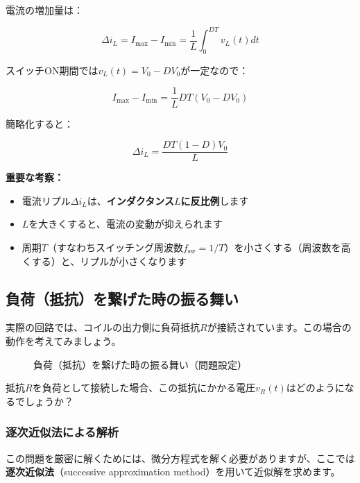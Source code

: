 電流の増加量は：

\begin{equation}
\Delta i_L = I_{\max} - I_{\min} = \frac{1}{L} \int_0^{DT} v_L(t)dt
\end{equation}

スイッチON期間では$v_L(t) = V_0 - DV_0$が一定なので：

\begin{equation}
I_{\max} - I_{\min} = \frac{1}{L} DT(V_0 - DV_0)
\end{equation}

簡略化すると：

\begin{equation}
\boxed{\Delta i_L = \frac{DT(1-D)V_0}{L}}
\end{equation}

\textbf{重要な考察：}

\begin{itemize}
\item 電流リプル$\Delta i_L$は、\textbf{インダクタンス$L$に反比例}します
\item $L$を大きくすると、電流の変動が抑えられます
\item 周期$T$（すなわちスイッチング周波数$f_{\text{sw}} = 1/T$）を小さくする（周波数を高くする）と、リプルが小さくなります
\end{itemize}

\subsection{負荷（抵抗）を繋げた時の振る舞い}

実際の回路では、コイルの出力側に負荷抵抗$R$が接続されています。この場合の動作を考えてみましょう。

\begin{figure}[H]
\centering
{}
\caption{負荷（抵抗）を繋げた時の振る舞い（問題設定）}
\label{fig:ch04_inductor_resistor_problem}
\end{figure}

抵抗$R$を負荷として接続した場合、この抵抗にかかる電圧$v_R(t)$はどのようになるでしょうか？

\subsubsection{逐次近似法による解析}

この問題を厳密に解くためには、微分方程式を解く必要がありますが、ここでは\textbf{逐次近似法}（successive approximation method）を用いて近似解を求めます。

